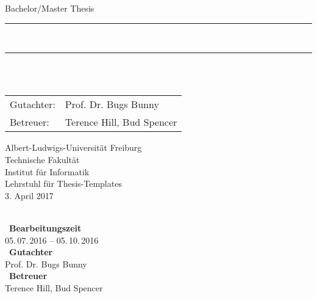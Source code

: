 \begin{titlepage}
\begin{center}

\newcommand{\HorizontalLine}{\rule{\linewidth}{0.3mm}}

{\Large Bachelor/Master Thesis}\\[1.3cm]


\HorizontalLine \\[0.4cm]
{ \huge \bfseries \thetitle }
\HorizontalLine \\[1.5cm]


{\Huge \theauthor} \\[2cm]


\begin{tabular}[hc]{>{\huge}l >{\huge}l}
  Gutachter: & Prof. Dr. Bugs Bunny \\[0.3cm]
  Betreuer: & Terence Hill, Bud Spencer \\[1.2cm]
\end{tabular}
\vfill  %

\Large {
    Albert-Ludwigs-Universität Freiburg\\
    Technische Fakultät\\
    Institut für Informatik\\
    Lehrstuhl für Thesis-Templates\\[1cm]

    3. April 2017
    \\
}
\end{center}
\end{titlepage}

\ \vfill \ \\  %
\
\textbf{Bearbeitungszeit}            \smallskip{} \\
05.\,07.\,2016 -- 05.\,10.\,2016   \bigskip{} \\
\
\textbf{Gutachter}                  \smallskip{} \\
Prof. Dr. Bugs Bunny               \bigskip{} \\
\
\textbf{Betreuer}                  \smallskip{} \\
Terence Hill, Bud Spencer
